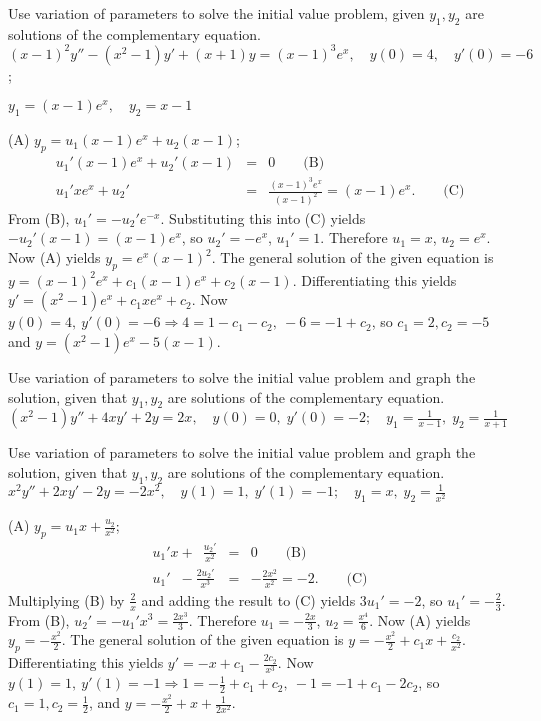 \documentclass{ximera}
\begin{document}
\begin{problem}\label{exer:5.7.32}
Use variation
of parameters to solve the initial value problem, given
$y_1,y_2$ are solutions of the complementary equation. $(x-1)^2y''-(x^2-1)y'+(x+1)y=(x-1)^3e^x, \quad  y(0)=4,\quad y'(0)=-6$;

$y_1=(x-1)e^x,\quad y_2=x-1$

\begin{solution}
    (A) $y_p=u_1(x-1)e^x+u_2(x-1)$;
\setcounter{equation}{1}
\begin{eqnarray*}
u_1'(x-1)e^x+u_2'(x-1)&=&0 \qquad\text{(B)}
\\ %
u_1'xe^x+u_2'&=&\frac{(x-1)^3e^x}{(x-1)^2}=(x-1)e^x. \qquad\text{(C)}
\end{eqnarray*}
From (B), $u_1'=-u_2'e^{-x}$. Substituting this into
(C) yields $-u_2'(x-1)=(x-1)e^x$, so $u_2'=-e^x$,
$u_1'=1$. Therefore $u_1=x$, $u_2=e^x$. Now (A) yields
$y_p=e^x(x-1)^2$. The general solution of the given equation is
$y=(x-1)^2e^x+c_1(x-1)e^x+c_2(x-1)$. Differentiating this yields
$y'=(x^2-1)e^x+c_1xe^x+c_2$. Now $y(0)=4,\ y'(0)=-6\Rightarrow
4=1-c_1-c_2,\ -6=-1+c_2$, so $c_1=2, c_2=-5$ and
$y=(x^2-1)e^x-5(x-1)$.
\end{solution}
\end{problem}

\begin{problem}\label{exer:5.7.33} Use variation
of parameters to solve the initial value problem and graph the
solution, given that $y_1,y_2$ are solutions of the complementary
equation.
$(x^2-1)y''+4xy'+2y=2x, \quad   y(0)=0,\;  y'(0)
=-2; \quad   y_1=\frac{1}{x-1},\;  y_2=\frac{1}{x+1}$
\end{problem}

\begin{problem}\label{exer:5.7.34} Use variation
of parameters to solve the initial value problem and graph the
solution, given that $y_1,y_2$ are solutions of the complementary
equation.
$x^2y''+2xy'-2y=-2x^2, \quad   y(1)=1,\;  y'(1)=
-1; \quad  y_1=x,\;  y_2=\frac{1}{x^2}$

\begin{solution}
    (A) $y_p=u_1x+\frac{u_2}{ x^2}$;
\setcounter{equation}{1}
\begin{eqnarray*}
u_1'x+\phantom{2}\frac{u_2'}{ x^2}&=&0\qquad\text{(B)}\\ %
u_1'\phantom{x}-\frac{2u_2'}{ x^3}&=&-\frac{2x^2}{
x^2}=-2.\qquad\text{(C)} %
\end{eqnarray*}
Multiplying (B) by $\frac{2}{ x}$ and adding the
result to (C) yields $3u_1'=-2$, so
$u_1'=-\frac{2}{3}$. From (B),
$u_2'=-u_1'x^3=\frac{2x^3}{3}$. Therefore $u_1=-\frac{2x}{3}$,
$u_2=\frac{x^4}{6}$. Now (A) yields $y_p=-\frac{x^2}{2}$. The
general solution of the given equation is
$y=-\frac{x^2}{2}+c_1x+\frac{c_2}{ x^2}$. Differentiating this
yields $y'=-x+c_1-\frac{2c_2}{ x^3}$. Now $y(1)=1,\
y'(1)=-1\Rightarrow 1=-\frac{1}{2}+c_1+c_2,\ -1=-1+c_1-2c_2$, so
$c_1=1, c_2=\frac{1}{2}$, and
$y=-\frac{x^2}{2}+x+\frac{1}{2x^2}$.

\end{solution}
\end{problem}
\end{document}

